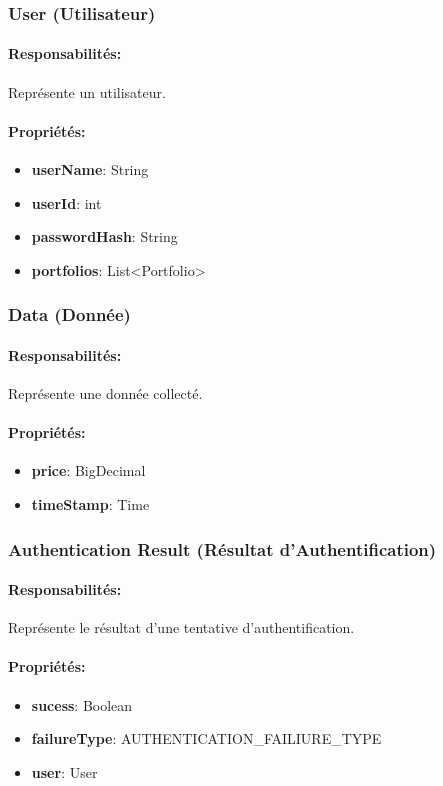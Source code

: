 \documentclass{article}
\begin{document}
\subsubsection{User (Utilisateur)}
\paragraph{Responsabilités:} Représente un utilisateur.
\paragraph{Propriétés:}
\begin{itemize}
  \item \textbf{userName}: String
  \item \textbf{userId}: int
  \item \textbf{passwordHash}: String
  \item \textbf{portfolios}: List<Portfolio>
\end{itemize}
\subsubsection{Data (Donnée)}
\paragraph{Responsabilités:} Représente une donnée collecté.
\paragraph{Propriétés:}
\begin{itemize}
  \item \textbf{price}: BigDecimal
  \item \textbf{timeStamp}: Time
\end{itemize}
\subsubsection{Authentication Result (Résultat d'Authentification)}
\paragraph{Responsabilités:} Représente le résultat d'une tentative d'authentification.
\paragraph{Propriétés:}
\begin{itemize}
  \item \textbf{sucess}: Boolean
  \item \textbf{failureType}: AUTHENTICATION\_FAILIURE\_TYPE
  \item \textbf{user}: User
\end{itemize}
\end{document}
